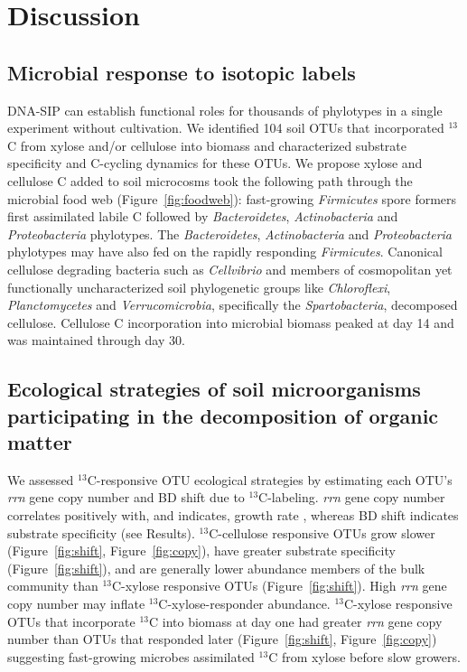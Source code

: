 \section{Discussion} 
\subsection{Microbial response to isotopic labels}
DNA-SIP can establish functional roles for thousands of phylotypes in a single
experiment without cultivation. We identified 104 soil OTUs that
incorporated $^{13}$C from xylose and/or cellulose into biomass and
characterized substrate specificity and C-cycling dynamics for these OTUs. We
propose xylose and cellulose C added to soil microcosms took the following path
through the microbial food web (Figure~\ref{fig:foodweb}): fast-growing
\textit{Firmicutes} spore formers first assimilated labile C followed by
\textit{Bacteroidetes}, \textit{Actinobacteria} and \textit{Proteobacteria}
phylotypes. The \textit{Bacteroidetes}, \textit{Actinobacteria} and
\textit{Proteobacteria} phylotypes may have also fed on the rapidly responding
\textit{Firmicutes}. Canonical cellulose degrading bacteria such as
\textit{Cellvibrio} and members of cosmopolitan yet functionally
uncharacterized soil phylogenetic groups like \textit{Chloroflexi},
\textit{Planctomycetes} and \textit{Verrucomicrobia}, specifically the
\textit{Spartobacteria}, decomposed cellulose. Cellulose C incorporation into
microbial biomass peaked at day 14 and was maintained through day 30.

\subsection{Ecological strategies of soil microorganisms participating in the
decomposition of organic matter}
We assessed $^{13}$C-responsive OTU ecological strategies by estimating each
OTU's \textit{rrn} gene copy number and BD shift due to $^{13}$C-labeling.
\textit{rrn} gene copy number correlates positively with, and indicates, growth
rate \citep{11125085,Kembel_2012}, whereas BD shift indicates substrate
specificity (see Results). $^{13}$C-cellulose responsive OTUs grow slower
(Figure~\ref{fig:shift}, Figure~\ref{fig:copy}), have greater substrate
specificity (Figure~\ref{fig:shift}), and are generally lower abundance members
of the bulk community than $^{13}$C-xylose responsive OTUs
(Figure~\ref{fig:shift}). High \textit{rrn} gene copy number may inflate
$^{13}$C-xylose-responder abundance. $^{13}$C-xylose responsive OTUs that
incorporate $^{13}$C into biomass at day one had greater \textit{rrn} gene copy
number than OTUs that responded later (Figure~\ref{fig:shift},
Figure~\ref{fig:copy}) suggesting fast-growing
microbes assimilated $^{13}$C from xylose before slow growers.

